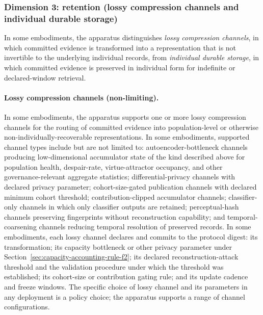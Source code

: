 \documentclass[a4paper,12pt]{article}
\begin{document}
\subsubsection{Dimension 3: retention (lossy compression channels
  and individual durable storage)}
\label{sec:privacy-retention}

In some embodiments, the apparatus distinguishes \emph{lossy
compression channels}, in which committed evidence is transformed
into a representation that is not invertible to the underlying
individual records, from \emph{individual durable storage}, in which
committed evidence is preserved in individual form for indefinite
or declared-window retrieval.

\paragraph{Lossy compression channels (non-limiting).}
In some embodiments, the apparatus supports one or more lossy
compression channels for the routing of committed evidence into
population-level or otherwise non-individually-recoverable
representations. In some embodiments, supported channel types
include but are not limited to: autoencoder-bottleneck channels
producing low-dimensional accumulator state of the kind described
above for population health, despair-rate, virtue-attractor occupancy,
and other governance-relevant aggregate statistics; differential-privacy
channels with declared privacy parameter; cohort-size-gated
publication channels with declared minimum cohort threshold;
contribution-clipped accumulator channels; classifier-only channels
in which only classifier outputs are retained; perceptual-hash
channels preserving fingerprints without reconstruction capability;
and temporal-coarsening channels reducing temporal resolution of
preserved records. In some embodiments, each lossy channel declares
and commits to the protocol digest: its transformation; its capacity
bottleneck or other privacy parameter under
Section~\ref{sec:capacity-accounting-rule-f2}; its declared
reconstruction-attack threshold and the validation procedure under
which the threshold was established; its cohort-size or contribution
gating rule; and its update cadence and freeze windows. The specific
choice of lossy channel and its parameters in any deployment is a
policy choice; the apparatus supports a range of channel
configurations.
\end{document}
